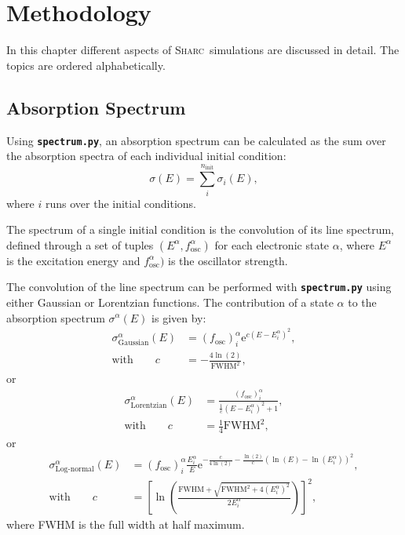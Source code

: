 \documentclass[a4paper,10pt,DIV=15,openany]{scrbook}
\newcommand{\sharc}{\textsc{Sharc}}
\newcommand{\ttt}[1]{\textbf{\texttt{#1}}}
\newcommand{\E}{\ensuremath{\mathrm{e}}}
\begin{document}
\chapter{Methodology}
\label{chap:met}

In this chapter different aspects of \sharc\ simulations are discussed in detail. The topics are ordered alphabetically.


\section{Absorption Spectrum}\label{met:spectrum}

Using \ttt{spectrum.py}, an absorption spectrum can be calculated as the sum over the absorption spectra of each individual initial condition:
\begin{equation}
  \sigma(E)=\sum\limits_i^{n_\text{init}} \sigma_i(E),
\end{equation}
where $i$ runs over the initial conditions.

The spectrum of a single initial condition is the convolution of its line spectrum, defined through a set of tuples $(E^\alpha,f_\text{osc}^\alpha)$ for each electronic state $\alpha$, where $E^\alpha$ is the excitation energy and $f_\text{osc}^\alpha)$ is the oscillator strength.

The convolution of the line spectrum can be performed with \ttt{spectrum.py} using either Gaussian or Lorentzian functions. The contribution of a state $\alpha$ to the absorption spectrum $\sigma^\alpha(E)$ is given by:
\begin{align}
  \sigma_{\text{Gaussian}}^\alpha(E)&=
  \left(f_{\text{osc}}\right)_i^\alpha 
  \E^{c\left(E-E_i^\alpha\right)^2},\\
  \text{with}\qquad
  c&=-\frac{4\ln(2)}{\text{FWHM}^2},
\end{align}
or
\begin{align}
  \sigma_{\text{Lorentzian}}^\alpha(E)&=
  \frac{\left(f_{\text{osc}}\right)_i^\alpha}{\frac{1}{c}\left(E-E_i^\alpha\right)^2+1},\\
  \text{with}\qquad
  c&=\frac{1}{4}\text{FWHM}^2,
\end{align}
or
\begin{align}
  \sigma_{\text{Log-normal}}^\alpha(E)&=
  \left(f_{\text{osc}}\right)_i^\alpha 
  \frac{E_i^\alpha}{E}
  \E^{-\frac{c}{4\ln(2)}-\frac{\ln(2)}{c}\left(\ln(E)-\ln(E^\alpha_i)\right)^2},\\
  \text{with}\qquad
  c&=\left[\ln\left(\frac{\text{FWHM}+\sqrt{\text{FWHM}^2+4(E^\alpha_i)^2}}{2E^\alpha_i}\right)\right]^2,
\end{align}
where FWHM is the full width at half maximum.
\end{document}
